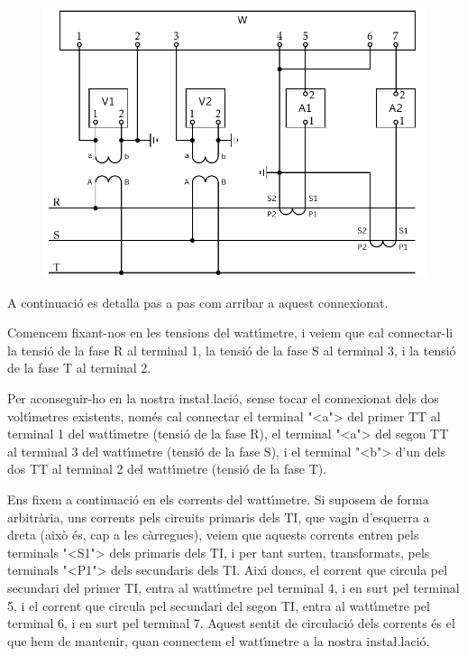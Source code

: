 \begin{exemple}
\begin{figure}[h]
\centering
    \includegraphics{Imatges/Cap-TrafosMesProt-Instal-Watt.pdf}
\end{figure}

\end{exemple}

A continuaci\'{o} es detalla pas a pas com arribar a aquest connexionat.

Comencem fixant-nos en les tensions del watt\'{\i}metre, i veiem que cal
connectar-li la tensi\'{o} de la fase R al terminal 1, la tensi\'{o} de la
fase S al terminal 3, i la tensi\'{o} de la fase T al terminal 2.

Per aconseguir-ho en la nostra insta{\l.l}aci\'{o}, sense tocar el
connexionat dels dos volt\'{\i}metres existents, nom\'{e}s cal connectar
el terminal {"<}\textsf{a}{">} del primer TT al terminal 1 del watt\'{\i}metre (tensi\'{o} de
la fase R), el terminal {"<}\textsf{a}{">} del segon TT al terminal 3 del watt\'{\i}metre
(tensi\'{o} de la fase S), i el terminal {"<}\textsf{b}{">} d'un dels dos TT
al terminal 2 del watt\'{\i}metre (tensi\'{o} de la fase T).

Ens fixem a continuaci\'{o} en els corrents del watt\'{\i}metre. Si suposem
de forma arbitr\`{a}ria, uns corrents pels circuits primaris dels TI,
que vagin d'esquerra a dreta (aix\`{o} \'{e}s, cap a les c\`{a}rregues), veiem
que aquests corrents entren pels terminals {"<}\textsf{S1}{">} dels primaris dels TI,
i per tant surten, transformats, pels terminals {"<}\textsf{P1}{">} dels secundaris
dels TI. Aix\'{\i} doncs, el corrent que circula pel secundari del primer
TI, entra al watt\'{\i}metre pel terminal 4, i en surt pel terminal 5, i
el corrent que circula pel secundari del segon TI, entra al
watt\'{\i}metre pel terminal 6, i en surt pel terminal 7. Aquest sentit
de circulaci\'{o} dels corrents \'{e}s el que hem de mantenir, quan
connectem el watt\'{\i}metre a la nostra insta{\l.l}aci\'{o}.

